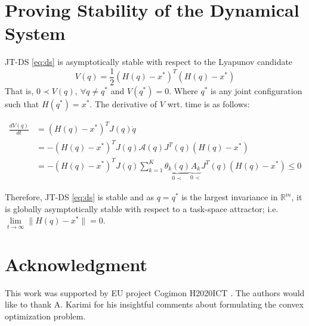 \documentclass[letterpaper, 10 pt, conference,fleqn]{ieeeconf}
\begin{document}
{\footnotesize
\appendices
\section{Proving Stability of the Dynamical System}
\label{appendix:stability}
JT-DS \eqref{eq:ds} is asymptotically stable with respect to the Lyapunov candidate
\[ V(q) = \frac{1}{2}(H(q) - x^*)^T(H(q) - x^*) \]
That is, $ 0 \prec V(q),~ \forall q \neq q^*$ and $ V(q^*) = 0 $. Where $q^*$ is any joint configuration such that $H(q^*) = x^*$.  The derivative of $ V $ wrt. time is as follows:

\begin{equation}
\begin{aligned}
\frac{dV(q)}{dt} &= (H(q) - x^*)^TJ(q)\dot{q}\\
&= -(H(q) - x^*)^TJ(q)\mathcal{A}(q)J^T(q)(H(q) - x^*)\\
&= -(H(q) - x^*)^TJ(q)\sum_{k=1}^{K}\underbrace{\theta_k(q)}_{0\prec}\underbrace{A_k}_{0\prec}J^T(q)(H(q) - x^*)\leq 0
\end{aligned}
\end{equation}

 Therefore, JT-DS \eqref{eq:ds} is stable and as $ q=q^* $ is the largest invariance in $ \mathbb{R}^m $, it is  globally asymptotically stable with respect to a task-space attractor; i.e. $\lim\limits_{t\rightarrow \infty} \| H(q)-x^*\|=0 $.}

\section*{Acknowledgment}
\footnotesize
This work was supported by EU project Cogimon H2020\textendash ICT . The authors would like to thank A. Karimi for his insightful comments about formulating the convex optimization problem.




%







\end{document}
